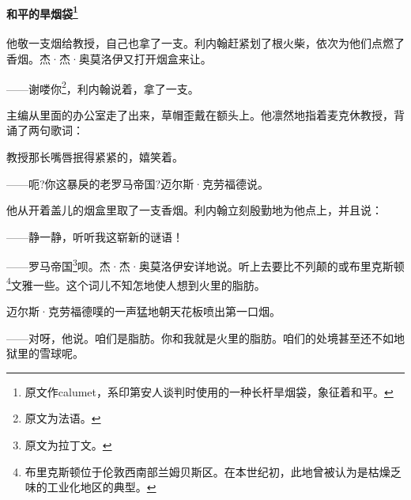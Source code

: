 \paragraph*{和平的旱烟袋\footnote{原文作calumet，系印第安人谈判时使用的一种长杆旱烟袋，象征着和平。}}
\par 他敬一支烟给教授，自己也拿了一支。利内翰赶紧划了根火柴，依次为他们点燃了香烟。杰·杰·奥莫洛伊又打开烟盒来让。
\par ——谢喽你\footnote{原文为法语。}，利内翰说着，拿了一支。
\par 主编从里面的办公室走了出来，草帽歪戴在额头上。他凛然地指着麦克休教授，背诵了两句歌词：
\par 教授那长嘴唇抿得紧紧的，嬉笑着。
\par ——呃?你这暴戾的老罗马帝国?迈尔斯·克劳福德说。
\par 他从开着盖儿的烟盒里取了一支香烟。利内翰立刻殷勤地为他点上，并且说：
\par ——静一静，听听我这崭新的谜语！
\par ——罗马帝国\footnote{原文为拉丁文。}呗。杰·杰·奥莫洛伊安详地说。听上去要比不列颠的或布里克斯顿\footnote{布里克斯顿位于伦敦西南部兰姆贝斯区。在本世纪初，此地曾被认为是枯燥乏味的工业化地区的典型。}文雅一些。这个词儿不知怎地使人想到火里的脂肪。
\par 迈尔斯·克劳福德噗的一声猛地朝天花板喷出第一口烟。
\par ——对呀，他说。咱们是脂肪。你和我就是火里的脂肪。咱们的处境甚至还不如地狱里的雪球呢。
